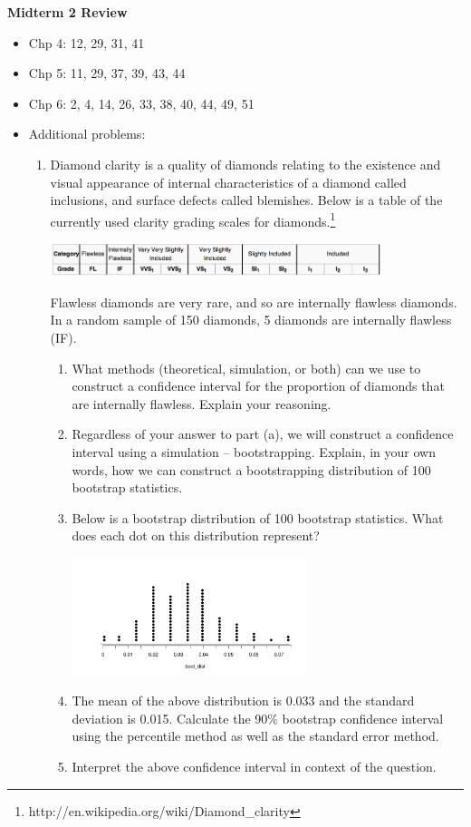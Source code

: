 \documentclass[11pt]{article}
\begin{document}
{\LARGE \textbf{Midterm 2 Review}}

\begin{itemize}
\item Chp 4: 12, 29, 31, 41
\item Chp 5: 11, 29, 37, 39, 43, 44
\item Chp 6: 2, 4, 14, 26, 33, 38, 40, 44, 49, 51
\item Additional problems:
\begin{enumerate}
 
%

\item Diamond clarity is a quality of diamonds relating to the existence and visual appearance of internal characteristics of a diamond called inclusions, and surface defects called blemishes. Below is a table of the currently used clarity grading scales for diamonds.\footnote{http://en.wikipedia.org/wiki/Diamond\_clarity} 
\begin{center}
\includegraphics[width=0.8\textwidth]{figures/diamond/diamond_clarity} 
\end{center}
Flawless diamonds are very rare, and so are internally flawless diamonds. In a random sample of 150 diamonds, 5 diamonds are internally flawless (IF).
\begin{enumerate}
\item What methods (theoretical, simulation, or both) can we use to construct a confidence interval for the proportion of diamonds that are internally flawless. Explain your reasoning.
\item Regardless of your answer to part (a), we will construct a confidence interval using a simulation -- bootstrapping. Explain, in your own words, how we can construct a bootstrapping distribution of 100 bootstrap statistics.
\item Below is a bootstrap distribution of 100 bootstrap statistics. What does each dot on this distribution represent? 
\begin{center}
\includegraphics[width=0.6\textwidth]{figures/diamond/diamonds_clarity_boot} 
\end{center}
\item The mean of the above distribution is 0.033 and the standard deviation is 0.015. Calculate the 90\% bootstrap confidence interval using the percentile method as well as the standard error method.
\item Interpret the above confidence interval in context of the question.
\end{enumerate}


\end{enumerate}
\end{itemize}
\end{document}
